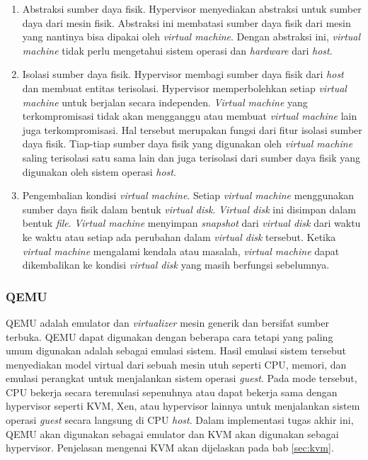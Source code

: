 \begin{enumerate}
  
  \item Abstraksi sumber daya fisik. Hypervisor menyediakan abstraksi untuk sumber
    daya dari mesin fisik. Abstraksi ini membatasi sumber daya fisik dari mesin yang
    nantinya bisa dipakai oleh \emph{virtual machine}. Dengan abstraksi ini,
    \emph{virtual machine} tidak perlu mengetahui sistem operasi dan \emph{hardware}
    dari \emph{host}.

  \item Isolasi sumber daya fisik. Hypervisor membagi sumber daya fisik dari \emph{host}
    dan membuat entitas terisolasi. Hypervisor memperbolehkan setiap \emph{virtual machine} 
    untuk berjalan secara independen. \emph{Virtual machine} yang terkompromisasi tidak
    akan mengganggu atau membuat \emph{virtual machine} lain juga terkompromisasi. Hal
    tersebut merupakan fungsi dari fitur isolasi sumber daya fisik. Tiap-tiap sumber daya fisik
    yang digunakan oleh \emph{virtual machine} saling terisolasi satu sama lain dan juga
    terisolasi dari sumber daya fisik yang digunakan oleh sistem operasi \emph{host}.

  \item Pengembalian kondisi \emph{virtual machine}. Setiap \emph{virtual machine} menggunakan
    sumber daya fisik dalam bentuk \emph{virtual disk}. \emph{Virtual disk} ini disimpan
    dalam bentuk \emph{file}. \emph{Virtual machine} menyimpan \emph{snapshot} dari \emph{virtual disk}
    dari waktu ke waktu atau setiap ada perubahan dalam \emph{virtual disk} tersebut. Ketika \emph{virtual machine}
    mengalami kendala atau masalah, \emph{virtual machine} dapat dikembalikan ke kondisi \emph{virtual disk}
    yang masih berfungsi sebelumnya.

\end{enumerate}

\subsubsection{QEMU}

QEMU \parencite{qemu-website} adalah emulator dan \emph{virtualizer} mesin generik dan bersifat sumber terbuka.
QEMU dapat digunakan dengan beberapa cara tetapi yang paling umum digunakan adalah sebagai
emulasi sistem. Hasil emulasi sistem tersebut menyediakan model virtual dari sebuah mesin
utuh seperti CPU, memori, dan emulasi perangkat untuk menjalankan sistem operasi \emph{guest}.
Pada mode tersebut, CPU bekerja secara teremulasi sepenuhnya atau dapat bekerja sama
dengan hypervisor seperti KVM, Xen, atau hypervisor lainnya untuk menjalankan sistem
operasi \emph{guest} secara langsung di CPU \emph{host}.
Dalam implementasi tugas akhir ini, QEMU akan digunakan sebagai emulator dan KVM
akan digunakan sebagai hypervisor. Penjelasan mengenai KVM akan dijelaskan pada bab \ref{sec:kvm}.

